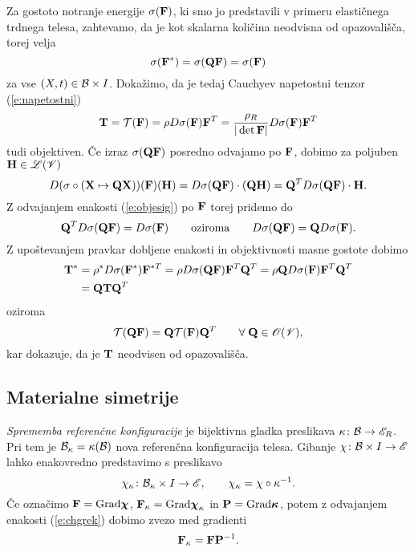 Za gostoto notranje energije $\sigma(\mathbf F)$, ki smo jo predstavili v primeru
elastičnega trdnega telesa, zahtevamo, da je kot skalarna količina neodvisna
od opazovališča, torej velja
\begin{equation} \label{e:objesig}
	\sigma(\mathbf F^*)=\sigma(\mathbf Q\mathbf F)=\sigma(\mathbf F)
\end{equation}
za vse $(X,t)\in\mathcal B\times I$.
Dokažimo, da je tedaj Cauchyev napetostni tenzor (\ref{e:napetostni})
\[
	\mathbf T=\mathcal{T}(\mathbf F)=\rho D\sigma(\mathbf F)\mathbf F^T
	=\frac{\rho_R}{|\det\mathbf F|} D\sigma(\mathbf F)\mathbf F^T
\]
tudi objektiven. Če izraz $\sigma(\mathbf Q\mathbf F)$ posredno odvajamo po $\mathbf F$,
dobimo za poljuben $\mathbf H\in\mathscr L(\mathscr V)$
\[
	D(\sigma\circ(\mathbf X\mapsto\mathbf Q\mathbf X))(\mathbf F)(\mathbf H)=
	D\sigma(\mathbf Q\mathbf F)\cdot(\mathbf Q\mathbf H)=\mathbf Q^T D\sigma(\mathbf Q\mathbf F)\cdot\mathbf H.
\]
Z odvajanjem enakosti (\ref{e:objesig}) po $\mathbf F$ torej pridemo do
\[
	\mathbf Q^T D\sigma(\mathbf Q\mathbf F) = D\sigma(\mathbf F)\qquad\textrm{oziroma}
	\qquad D\sigma(\mathbf Q\mathbf F) = \mathbf QD\sigma(\mathbf F).
\]
Z upoštevanjem pravkar dobljene enakosti in objektivnosti masne gostote dobimo
\begin{align*}
	\mathbf T^*&=\rho^* D\sigma(\mathbf F^*)\mathbf F^{*T}
	=\rho D\sigma(\mathbf Q\mathbf F)\mathbf F^{T}\mathbf Q^{T}
	=\rho \mathbf Q D\sigma(\mathbf F)\mathbf F^{T}\mathbf Q^{T} \nonumber \\
	&=\mathbf Q\mathbf T\mathbf Q^{T}
\end{align*}
oziroma
\[
	\mathcal{T}(\mathbf Q\mathbf F)=\mathbf Q\mathcal{T}(\mathbf F)\mathbf Q^{T}\qquad\forall\;\mathbf Q\in\mathscr{O}(\mathscr V),
\]
kar dokazuje, da je $\mathbf T$ neodvisen od opazovališča.


\subsection{Materialne simetrije}


\emph{Sprememba referenčne konfiguracije} je bijektivna gladka preslikava $\kappa\colon\mathcal B\to\mathscr E_R$.
Pri tem je $\mathcal B_{\kappa}=\kappa(\mathcal B)$ nova referenčna konfiguracija telesa. Gibanje
$\chi\colon\mathcal B\times I\to\mathscr E$ lahko enakovredno predstavimo s preslikavo
\begin{equation} \label{e:chgrek}
	\chi_{\kappa}\colon\mathcal B_{\kappa}\times I\to\mathscr E, \qquad
	\chi_{\kappa}=\chi\circ\kappa^{-1}.
\end{equation}
Če označimo $\mathbf F=\mathrm{Grad}\boldsymbol \chi$, $\mathbf F_{\kappa}=\mathrm{Grad}\boldsymbol \chi_{\kappa}$
in $\mathbf P=\mathrm{Grad}\boldsymbol \kappa$, potem z odvajanjem enakosti (\ref{e:chgrek})
dobimo zvezo med gradienti
\[
	\mathbf F_{\kappa}=\mathbf F\mathbf P^{-1}.
\]

